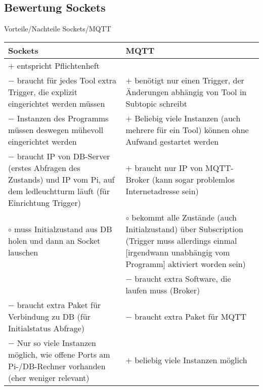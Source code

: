 \documentclass{scrartcl}
\begin{document}
\subsection{Bewertung Sockets}
\begin{center}
Vorteile/Nachteile Sockets/MQTT\\
\begin{longtable}{L{.45} L{.45}}
Sockets & MQTT\\\hline
$+$ entspricht Pflichtenheft & \\
$-$ braucht für jedes Tool extra Trigger, die explizit eingerichtet werden müssen & $+$ benötigt nur einen Trigger, der Änderungen abhängig von Tool in Subtopic schreibt\\
$-$ Instanzen des Programms müssen deswegen mühevoll eingerichtet werden & $+$ Beliebig viele Instanzen (auch mehrere für ein Tool) können ohne Aufwand gestartet werden\\
$-$ braucht IP von DB-Server (erstes Abfragen des Zustands) und IP vom Pi, auf dem ledleuchtturm läuft (für Einrichtung Trigger) & $+$ braucht nur IP von MQTT-Broker (kann sogar problemlos Internetadresse sein)\\
$\circ$ muss Initialzustand aus DB holen und dann an Socket lauschen & $\circ$ bekommt alle Zustände (auch Initialzustand) über Subscription (Trigger muss allerdings einmal [irgendwann unabhängig vom Programm] aktiviert worden sein)\\
 & $-$ braucht extra Software, die laufen muss (Broker)\\
$-$ braucht extra Paket für Verbindung zu DB (für Initialstatus Abfrage) & $-$ braucht extra Paket für MQTT\\
$-$ Nur so viele Instanzen möglich, wie offene Ports am Pi-/DB-Rechner vorhanden (eher weniger relevant) & $+$ beliebig viele Instanzen möglich\\
\end{longtable}
\end{center}
\end{document}

